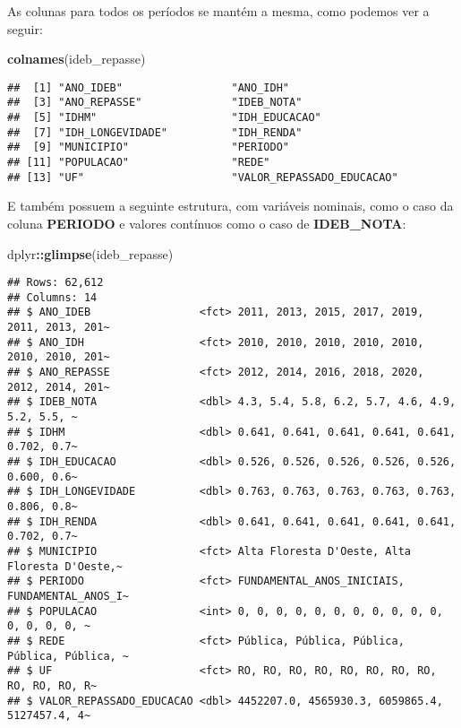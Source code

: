 \documentclass[
]{article}
\newenvironment{Shaded}{\begin{snugshade}}{\end{snugshade}}
\newcommand{\KeywordTok}[1]{\textcolor[rgb]{0.13,0.29,0.53}{\textbf{#1}}}
\newcommand{\NormalTok}[1]{#1}
\newcommand{\OperatorTok}[1]{\textcolor[rgb]{0.81,0.36,0.00}{\textbf{#1}}}
\begin{document}
As colunas para todos os períodos se mantém a mesma, como podemos ver a
seguir:

\begin{Shaded}
\begin{Highlighting}[]
\KeywordTok{colnames}\NormalTok{(ideb\_repasse)}
\end{Highlighting}
\end{Shaded}

\begin{verbatim}
##  [1] "ANO_IDEB"                 "ANO_IDH"                 
##  [3] "ANO_REPASSE"              "IDEB_NOTA"               
##  [5] "IDHM"                     "IDH_EDUCACAO"            
##  [7] "IDH_LONGEVIDADE"          "IDH_RENDA"               
##  [9] "MUNICIPIO"                "PERIODO"                 
## [11] "POPULACAO"                "REDE"                    
## [13] "UF"                       "VALOR_REPASSADO_EDUCACAO"
\end{verbatim}

E também possuem a seguinte estrutura, com variáveis nominais, como o
caso da coluna \textbf{PERIODO} e valores contínuos como o caso de
\textbf{IDEB\_NOTA}:

\begin{Shaded}
\begin{Highlighting}[]
\NormalTok{dplyr}\OperatorTok{::}\KeywordTok{glimpse}\NormalTok{(ideb\_repasse)}
\end{Highlighting}
\end{Shaded}

\begin{verbatim}
## Rows: 62,612
## Columns: 14
## $ ANO_IDEB                 <fct> 2011, 2013, 2015, 2017, 2019, 2011, 2013, 201~
## $ ANO_IDH                  <fct> 2010, 2010, 2010, 2010, 2010, 2010, 2010, 201~
## $ ANO_REPASSE              <fct> 2012, 2014, 2016, 2018, 2020, 2012, 2014, 201~
## $ IDEB_NOTA                <dbl> 4.3, 5.4, 5.8, 6.2, 5.7, 4.6, 4.9, 5.2, 5.5, ~
## $ IDHM                     <dbl> 0.641, 0.641, 0.641, 0.641, 0.641, 0.702, 0.7~
## $ IDH_EDUCACAO             <dbl> 0.526, 0.526, 0.526, 0.526, 0.526, 0.600, 0.6~
## $ IDH_LONGEVIDADE          <dbl> 0.763, 0.763, 0.763, 0.763, 0.763, 0.806, 0.8~
## $ IDH_RENDA                <dbl> 0.641, 0.641, 0.641, 0.641, 0.641, 0.702, 0.7~
## $ MUNICIPIO                <fct> Alta Floresta D'Oeste, Alta Floresta D'Oeste,~
## $ PERIODO                  <fct> FUNDAMENTAL_ANOS_INICIAIS, FUNDAMENTAL_ANOS_I~
## $ POPULACAO                <int> 0, 0, 0, 0, 0, 0, 0, 0, 0, 0, 0, 0, 0, 0, 0, ~
## $ REDE                     <fct> Pública, Pública, Pública, Pública, Pública, ~
## $ UF                       <fct> RO, RO, RO, RO, RO, RO, RO, RO, RO, RO, RO, R~
## $ VALOR_REPASSADO_EDUCACAO <dbl> 4452207.0, 4565930.3, 6059865.4, 5127457.4, 4~
\end{verbatim}
\end{document}

